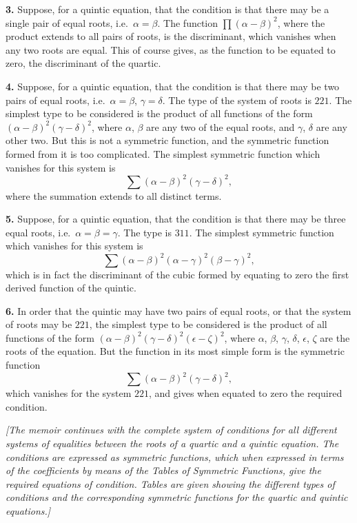 \documentclass[11pt,a4paper]{article}
\begin{document}
\textbf{3.} Suppose, for a quintic equation, that the condition is that there
may be a single pair of equal roots, i.e.\ $\alpha = \beta$. The function
$\prod(\alpha - \beta)^2$, where the product extends to all pairs of roots,
is the discriminant, which vanishes when any two roots are equal. This of
course gives, as the function to be equated to zero, the discriminant of the
quartic.

\textbf{4.} Suppose, for a quintic equation, that the condition is that there
may be two pairs of equal roots, i.e.\ $\alpha = \beta$, $\gamma = \delta$.
The type of the system of roots is $221$. The simplest type to be considered
is the product of all functions of the form
$(\alpha - \beta)^2 (\gamma - \delta)^2$, where $\alpha$, $\beta$ are any
two of the equal roots, and $\gamma$, $\delta$ are any other two. But this
is not a symmetric function, and the symmetric function formed from it is too
complicated. The simplest symmetric function which vanishes for this system is
\[
\sum (\alpha - \beta)^2 (\gamma - \delta)^2,
\]
where the summation extends to all distinct terms.

\textbf{5.} Suppose, for a quintic equation, that the condition is that there
may be three equal roots, i.e.\ $\alpha = \beta = \gamma$. The type is
$311$. The simplest symmetric function which vanishes for this system is
\[
\sum (\alpha - \beta)^2 (\alpha - \gamma)^2 (\beta - \gamma)^2,
\]
which is in fact the discriminant of the cubic formed by equating to zero the
first derived function of the quintic.

\textbf{6.} In order that the quintic may have two pairs of equal roots, or
that the system of roots may be $221$, the simplest type to be considered is
the product of all functions of the form
$(\alpha - \beta)^2 (\gamma - \delta)^2 (\epsilon - \zeta)^2$, where
$\alpha$, $\beta$, $\gamma$, $\delta$, $\epsilon$, $\zeta$ are the roots of
the equation. But the function in its most simple form is the symmetric
function
\[
\sum (\alpha - \beta)^2 (\gamma - \delta)^2,
\]
which vanishes for the system $221$, and gives when equated to zero the
required condition.

\textit{[The memoir continues with the complete system of conditions for all
different systems of equalities between the roots of a quartic and a quintic
equation. The conditions are expressed as symmetric functions, which when
expressed in terms of the coefficients by means of the Tables of Symmetric
Functions, give the required equations of condition. Tables are given showing
the different types of conditions and the corresponding symmetric functions
for the quartic and quintic equations.]}
\end{document}
